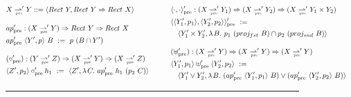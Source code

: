 \documentclass[preprint]{sigplanconf}
\newcommand{\pto}{\rightharpoonup}
\newcommand{\join}{\vee}
\newcommand{\pre}{_\mathrm{pre}}
\newcommand{\prepto}{\pto_{\mspace{-19mu}\pre}}
\begin{document}
\begin{figure*}[t]\centering
\begin{minipage}{\textwidth}
\begin{align*}
\begin{aligned}[t]
	&\begin{aligned}[t]
		&X \prepto' Y ::= \pair{Rect~Y, Rect~Y \tto Rect~X}
	\end{aligned} \\
\\[-6pt]
	&\begin{aligned}[t]
		&ap\pre' : (X \prepto' Y) \tto Rect~Y \tto Rect~X \\
		&ap\pre'~\pair{Y',p}~B \ := \ p~(B \i Y') 
	\end{aligned} \\
\\[-6pt]
	&\begin{aligned}[t]
		&(\circ\pre') : (Y \prepto' Z) \tto (X \prepto' Y) \tto (X \prepto' Z) \\
		&\pair{Z',p_2} \circ\pre' h_1 \ := \ \pair{Z', \fun{C}{ap\pre'~h_1~(p_2~C)}}
	\end{aligned} \\
\end{aligned}
&\tab\tab\tab
\begin{aligned}[t]
	&\begin{aligned}[t]
		&\pair{\cdot,\cdot}\pre' : (X \prepto' Y_1) \tto (X \prepto' Y_2) \tto (X \prepto' Y_1 \times Y_2) \\
		&\pair{\pair{Y_1',p_1},\pair{Y_2',p_2}}\pre' \ := \\
		&\tab\pair{Y_1' \times Y_2',\fun{B}{p_1~(proj_{fst}~B) \i p_2~(proj_{snd}~B)}}
	\end{aligned} \\
\\[-6pt]
	&\begin{aligned}[t]
		&(\uplus\pre') : (X \prepto' Y) \tto (X \prepto' Y) \tto (X \prepto' Y) \\
		&\pair{Y_1',p_1} \uplus\pre' \pair{Y_2',p_2} \ := \\
		&\tab\pair{Y_1' \join Y_2',\fun{B}{(ap\pre'~\pair{Y_1',p_1}~B) \join (ap\pre'~\pair{Y_2',p_2}~B)}
		}
	\end{aligned}
\end{aligned}
\end{align*}
\hrule
{}
\end{minipage}
\begin{minipage}{\textwidth}

\end{minipage}
\end{figure*}
\end{document}
